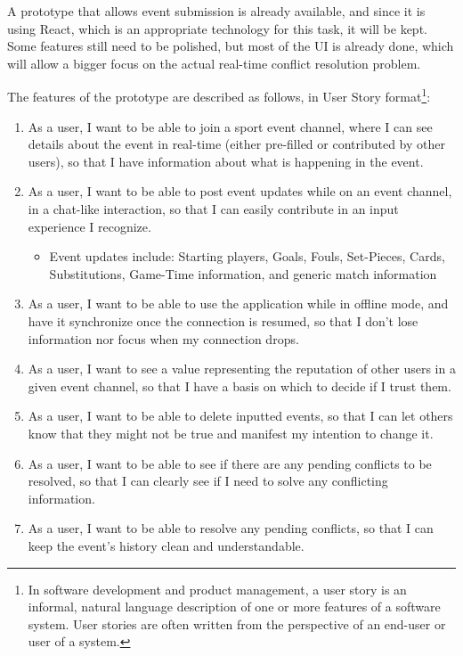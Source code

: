 A prototype that allows event submission is already available, and since it is using React, which is an appropriate technology for this task, it will be kept. Some features still need to be polished, but most of the UI is already done, which will allow a bigger focus on the actual real-time conflict resolution problem.

The features of the prototype are described as follows, in User Story format\footnote{In software development and product management, a user story is an informal, natural language description of one or more features of a software system. User stories are often written from the perspective of an end-user or user of a system.}:

\begin{enumerate}[leftmargin  = 3.25\parindent, align=left, label=US\arabic*, start=1]
    \item As a user, I want to be able to join a sport event channel, where I can see details about the event in real-time (either pre-filled or contributed by other users), so that I have information about what is happening in the event.
    \item As a user, I want to be able to post event updates while on an event channel, in a chat-like interaction, so that I can easily contribute in an input experience I recognize.
    \begin{itemize}
        \item Event updates include: Starting players, Goals, Fouls, Set-Pieces, Cards, Substitutions, Game-Time information, and generic match information
    \end{itemize} 
    \item As a user, I want to be able to use the application while in offline mode, and have it synchronize once the connection is resumed, so that I don't lose information nor focus when my connection drops.
    \item As a user, I want to see a value representing the reputation of other users in a given event channel, so that I have a basis on which to decide if I trust them. 
    \item As a user, I want to be able to delete inputted events, so that I can let others know that they might not be true and manifest my intention to change it.
    \item As a user, I want to be able to see if there are any pending conflicts to be resolved, so that I can clearly see if I need to solve any conflicting information.
    \item As a user, I want to be able to resolve any pending conflicts, so that I can keep the event's history clean and understandable.

\end{enumerate}
